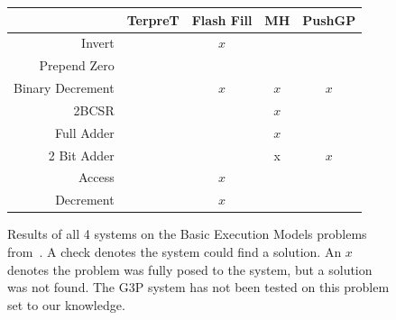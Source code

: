 \begin{figure}
\begin{tabular}{ r | c c c c }
	& TerpreT & Flash Fill & MH & PushGP \\
	\hline
	Invert & \checkmark & $x$ & \checkmark & \checkmark \\
	Prepend Zero & \checkmark & \checkmark & \checkmark & \checkmark \\
	Binary Decrement & \checkmark & $x$ & $x$ & $x$ \\
	2BCSR & \checkmark &  & $x$ & \checkmark \\
	Full Adder & \checkmark &  & $x$ & \checkmark \\
	2 Bit Adder & \checkmark &  & x & $x$ \\
	Access & \checkmark & $x$ & \checkmark & \checkmark \\
	Decrement & \checkmark & $x$ & \checkmark & \checkmark \\
\end{tabular}
\caption{Results of all 4 systems on the Basic Execution Models problems from~\cite{Gaunt2016}.  A check denotes the system could find a solution. An $x$ denotes the problem was fully posed to the system, but a solution was not found. The G3P system has not been tested on this problem set to our knowledge.}
\label{fig:results1}
\end{figure}

